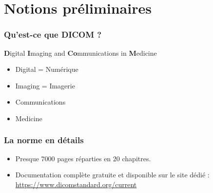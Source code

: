\section{Notions pr\'eliminaires}

	\frame
	{
		\frametitle{Qu'est-ce que DICOM ?}
		
		\begin{block}{\textbf{D}igital \textbf{I}maging and \textbf{Co}mmunications in \textbf{M}edicine}
		\begin{itemize}
			\item Digital = Num\'erique
		    	\item Imaging = Imagerie
		    	\item Communications
		    	\item Medicine
			\end{itemize}
		\end{block}
	}
	
	\frame
	{
		\frametitle{La norme en d\'etails}
		\begin{itemize}
			\item Presque $7000$ pages r\'eparties en $20$ chapitres.
			\item Documentation compl\`ete gratuite et disponible sur le site d\'edi\'e : \url{https://www.dicomstandard.org/current}	
		\end{itemize}
	}

